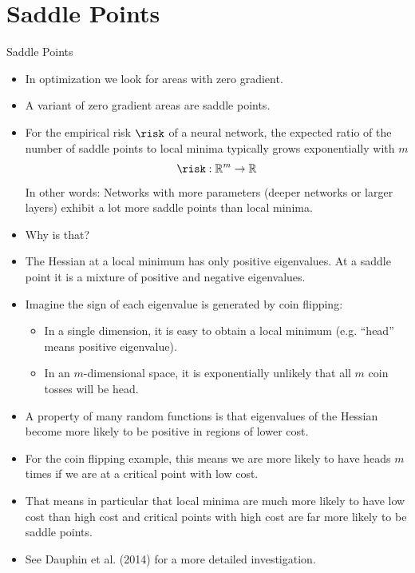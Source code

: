 \documentclass[11pt,compress,t,notes=noshow, xcolor=table]{beamer}
\begin{document}
\section{Saddle Points}
\begin{vbframe}{Saddle Points}
  \begin{itemize}
    \item In optimization we look for areas with zero gradient.
    \item A variant of zero gradient areas are saddle points.
    \item For the empirical risk $\risk$ of a neural network, the expected ratio of the number of saddle points to local minima typically grows exponentially with $m$ 
    $$\risk: \mathbb{R}^m \rightarrow \mathbb{R}$$ 
    In other words: Networks with more parameters (deeper networks or larger layers) exhibit a lot more saddle points than local minima.
     \item Why is that?
    \item The Hessian at a local minimum has only positive eigenvalues. At a saddle point it is a mixture of positive and negative eigenvalues.
    
\framebreak
    
    \item Imagine the sign of each eigenvalue is generated by coin flipping:
    \begin{itemize}
      \item In a single dimension, it is easy to obtain a local minimum (e.g. \enquote{head} means positive eigenvalue).
      \item In an $m$-dimensional space, it is exponentially unlikely that all $m$ coin tosses will be head.
    \end{itemize}
    \item A property of many random functions is that eigenvalues of the Hessian become more likely to be positive in regions of lower cost.
    \item For the coin flipping example, this means we are more likely to have heads $m$ times if we are at a critical point with low cost.
    \item That means in particular that local minima are much more likely to have low cost than high cost and critical points with high cost are far more likely to be saddle points.
    \item See Dauphin et al. (2014) for a more detailed investigation.
  \end{itemize}
\end{vbframe}
\end{document}
